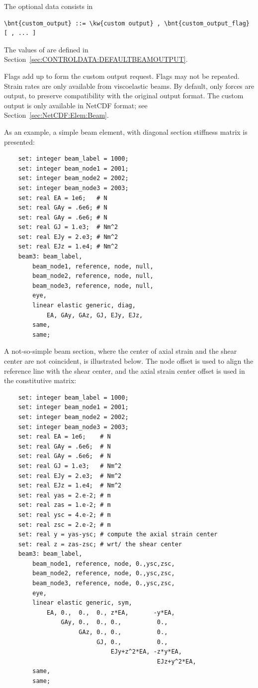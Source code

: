 The  optional data consists in
\begin{Verbatim}[commandchars=\\\{\}]
    \bnt{custom_output} ::= \kw{custom output} , \bnt{custom_output_flag} [ , ... ]
\end{Verbatim}
The values of 
are defined in Section~\ref{sec:CONTROLDATA:DEFAULTBEAMOUTPUT}.

Flags add up to form the custom output request.
Flags may not be repeated.
Strain rates are only available from viscoelastic beams.
By default, only forces are output, to preserve compatibility
with the original output format.
The custom output is only available in NetCDF format;
see Section~\ref{sec:NetCDF:Elem:Beam}.

As an example, a simple beam element, with diagonal section stiffness 
matrix is presented:
\begin{verbatim}
    set: integer beam_label = 1000;
    set: integer beam_node1 = 2001;
    set: integer beam_node2 = 2002;
    set: integer beam_node3 = 2003;
    set: real EA = 1e6;   # N
    set: real GAy = .6e6; # N
    set: real GAy = .6e6; # N
    set: real GJ = 1.e3;  # Nm^2
    set: real EJy = 2.e3; # Nm^2
    set: real EJz = 1.e4; # Nm^2
    beam3: beam_label,
        beam_node1, reference, node, null,
        beam_node2, reference, node, null,
        beam_node3, reference, node, null,
        eye,
        linear elastic generic, diag,
            EA, GAy, GAz, GJ, EJy, EJz,
        same,
        same;
\end{verbatim}

A not-so-simple beam section, where the center of axial strain 
and the shear center are not coincident, is illustrated below.
The node offset is used to align the reference line 
with the shear center, and the axial strain center offset 
is used in the constitutive matrix:
\begin{verbatim}
    set: integer beam_label = 1000;
    set: integer beam_node1 = 2001;
    set: integer beam_node2 = 2002;
    set: integer beam_node3 = 2003;
    set: real EA = 1e6;    # N
    set: real GAy = .6e6;  # N
    set: real GAy = .6e6;  # N
    set: real GJ = 1.e3;   # Nm^2
    set: real EJy = 2.e3;  # Nm^2
    set: real EJz = 1.e4;  # Nm^2
    set: real yas = 2.e-2; # m
    set: real zas = 1.e-2; # m
    set: real ysc = 4.e-2; # m
    set: real zsc = 2.e-2; # m
    set: real y = yas-ysc; # compute the axial strain center
    set: real z = zas-zsc; # wrt/ the shear center
    beam3: beam_label,
        beam_node1, reference, node, 0.,ysc,zsc,
        beam_node2, reference, node, 0.,ysc,zsc,
        beam_node3, reference, node, 0.,ysc,zsc,
        eye,
        linear elastic generic, sym,
            EA, 0.,  0.,  0., z*EA,       -y*EA,
                GAy, 0.,  0., 0.,          0.,
                     GAz, 0., 0.,          0.,
                          GJ, 0.,          0.,
                              EJy+z^2*EA, -z*y*EA,
                                           EJz+y^2*EA,
        same,
        same;
\end{verbatim}


